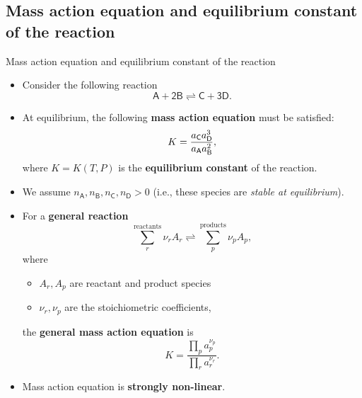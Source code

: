 \subsection{Mass action equation and equilibrium constant of the reaction}
%
\begin{frame}{Mass action equation and equilibrium constant of the reaction}

\lcol
\begin{itemize}
\item Consider the following reaction
\[
\mathsf{A+2B\rightleftharpoons C+3D}.
\]
\vskip -10pt
\pause
\item At equilibrium, the following \alert{\textbf{mass action equation}} must be
satisfied:
\[
K=\frac{a_{\sf C}a_{\sf D}^{3}}{a_{\sf A}a_{\sf B}^{2}},
\]
where $K=K(T,P)$ is the \alert{\textbf{equilibrium constant}} of the reaction.
\pause
\item We assume $n_{\mathsf{A}},n_{\mathsf{B}},n_{\mathsf{C}},n_{\mathsf{D}}>0$
(i.e., these species are \emph{stable at equilibrium}).

\end{itemize}
\rcol
\pause
\begin{itemize}
\item For a \textbf{general reaction}
\[
\sum_{r}^{\text{reactants}}\nu_{r}A_{r}\rightleftharpoons\sum_{p}^{\text{products}}\nu_{p}A_{p},
\]
where 
\begin{itemize}
\item $A_{r}, A_p$ are reactant and product species
\item $\nu_{r}, \nu_{p}$ are the stoichiometric coefficients,
\end{itemize}
%
the \alert{\textbf{general mass action equation}} is
\[
\boxed{
K=\dfrac{\prod_{p}a_{p}^{\nu_{p}}}{\prod_{r}a_{r}^{\nu_{r}}}.
}
\]
\pause
\item Mass action equation is \alert{\textbf{strongly non-linear}}.
\end{itemize}
\ecol
\end{frame}
%
